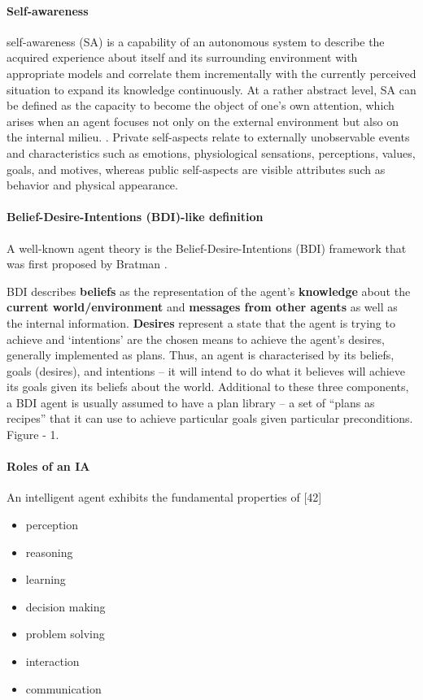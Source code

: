 \documentclass{article}
\begin{document}
	 \paragraph{Self-awareness} self-awareness (SA) is a capability of an autonomous system to describe the acquired
	 experience about itself and its surrounding environment with appropriate models and correlate them incrementally with the
	 currently perceived situation to expand its knowledge continuously. At a rather abstract level, SA can be defined as the capacity to become the object of one’s own attention, which arises when an agent focuses not only on the external environment but also on the internal milieu. \cite{regazzoni-2020-multi-sensorial-generative-and-descriptive-self-awareness-models-for-autonomous-systems}. Private self-aspects relate to externally unobservable events and characteristics such as emotions, physiological sensations, perceptions, values, goals, and motives, whereas public self-aspects are visible attributes such as behavior and physical appearance.
	 
	 
	 \paragraph{Belief-Desire-Intentions (BDI)-like definition}
	 A well-known agent theory  is the Belief-Desire-Intentions (BDI) framework that was first proposed by Bratman \citep{bratman-1999-intention-plans-and-practical-reason}. 
	 
	 BDI  describes \textbf{beliefs} as the representation of the agent’s \textbf{knowledge} about the \textbf{current world/environment} and \textbf{messages from other agents} as well as the internal information. \textbf{Desires} represent a state that the agent is trying to achieve and ‘intentions’ are the chosen means to achieve the agent’s desires, generally implemented as plans. Thus, an agent is characterised by its beliefs, goals (desires), and intentions – it will intend to do what it believes will achieve its goals given its beliefs about the world.  Additional to these three components, a BDI agent is usually assumed to have a plan library – a set of “plans as recipes” that it can use to achieve particular goals given particular preconditions.
	 Figure \cite{bratman-1999-intention-plans-and-practical-reason} - 1.  
	 
	 \paragraph{Roles of an IA}
		 An intelligent agent exhibits the fundamental properties of
		 \citet{rizk-2018-decision-making-in-multiagent-systems-a-survey} [42]
		 \begin{itemize}
		 	\item perception
		 	\item reasoning
		 	\item learning
		 	\item decision making
		 	\item problem solving
		 	\item interaction
		 	\item communication
		 \end{itemize}
	 
\end{document}
